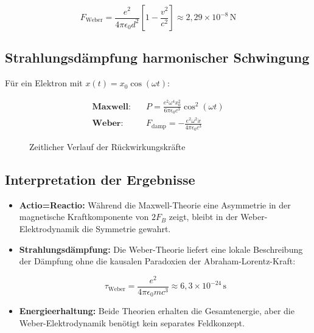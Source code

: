 \begin{equation}
F_{\text{Weber}} = \frac{e^2}{4\pi\epsilon_0 d^2}\left[1 - \frac{v^2}{c^2}\right] \approx 2,\!29\times10^{-8}\,\text{N}
\end{equation}

\subsection{Strahlungsdämpfung harmonischer Schwingung}

Für ein Elektron mit $x(t) = x_0\cos(\omega t)$:

\begin{align}
\textbf{Maxwell:}\quad & P = \frac{e^2\omega^4 x_0^2}{6\pi\epsilon_0 c^3}\cos^2(\omega t) \\
\textbf{Weber:}\quad & F_{\text{damp}} = -\frac{e^2\omega^2\dot{x}}{4\pi\epsilon_0 c^3}
\end{align}

\begin{figure}[ht]
\centering
{}
\caption{Zeitlicher Verlauf der Rückwirkungskräfte}
\end{figure}

\subsection{Interpretation der Ergebnisse}

\begin{itemize}
\item \textbf{Actio=Reactio:} Während die Maxwell-Theorie eine Asymmetrie in der magnetische Kraftkomponente von $2F_B$ zeigt, bleibt in der Weber-Elektrodynamik die Symmetrie gewahrt.

\item \textbf{Strahlungsdämpfung:} Die Weber-Theorie liefert eine lokale Beschreibung der Dämpfung ohne die kausalen Paradoxien der Abraham-Lorentz-Kraft:

\begin{equation}
\tau_{\text{Weber}} = \frac{e^2}{4\pi\epsilon_0 m c^3} \approx 6,\!3\times10^{-24}\,\text{s}
\end{equation}

\item \textbf{Energieerhaltung:} Beide Theorien erhalten die Gesamtenergie, aber die Weber-Elektrodynamik benötigt kein separates Feldkonzept.
\end{itemize}

